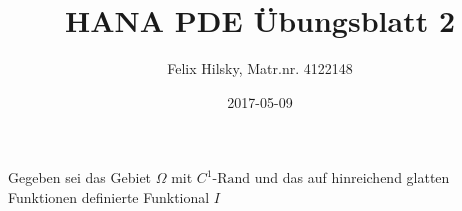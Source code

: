\documentclass{scrartcl}
\author{Felix Hilsky, Matr.nr. 4122148}
\title{HANA PDE Übungsblatt 2}
\date{2017-05-09}
\begin{document}
  \maketitle


  Gegeben sei das Gebiet
  $\Omega$ mit
  $C^1\text{-Rand}$ und das auf hinreichend glatten Funktionen definierte Funktional $I$
\end{document}
